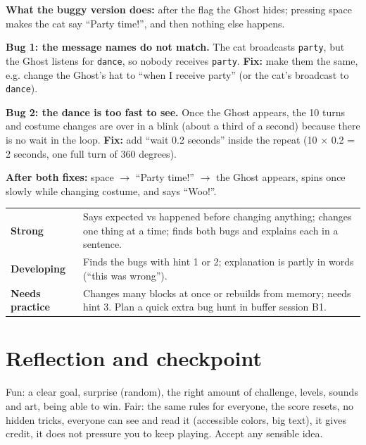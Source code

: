\begin{answer}
\textbf{What the buggy version does:} after the flag the Ghost hides; pressing space makes the cat say \enquote{Party time!}, and then nothing else happens.

\textbf{Bug 1: the message names do not match.} The cat broadcasts \texttt{party}, but the Ghost listens for \texttt{dance}, so nobody receives \texttt{party}. \textbf{Fix:} make them the same, e.g. change the Ghost's hat to \enquote{when I receive party} (or the cat's broadcast to \texttt{dance}).

\textbf{Bug 2: the dance is too fast to see.} Once the Ghost appears, the 10 turns and costume changes are over in a blink (about a third of a second) because there is no wait in the loop. \textbf{Fix:} add \enquote{wait 0.2 seconds} inside the repeat (10 × 0.2 = 2 seconds, one full turn of 360 degrees).

\textbf{After both fixes:} space $\rightarrow$ \enquote{Party time!} $\rightarrow$ the Ghost appears, spins once slowly while changing costume, and says \enquote{Woo!}.
\end{answer}

\begin{rubric}
\begin{tabular}{@{}p{4.2cm}p{11cm}@{}}
\textbf{Strong} & Says expected vs happened before changing anything; changes one thing at a time; finds both bugs and explains each in a sentence. \\
\textbf{Developing} & Finds the bugs with hint 1 or 2; explanation is partly in words (\enquote{this was wrong}). \\
\textbf{Needs practice} & Changes many blocks at once or rebuilds from memory; needs hint 3. Plan a quick extra bug hunt in buffer session B1. \\
\end{tabular}
\end{rubric}

\section{Reflection and checkpoint}
\begin{answer}
Fun: a clear goal, surprise (random), the right amount of challenge, levels, sounds and art, being able to win. Fair: the same rules for everyone, the score resets, no hidden tricks, everyone can see and read it (accessible colors, big text), it gives credit, it does not pressure you to keep playing. Accept any sensible idea.
\end{answer}

